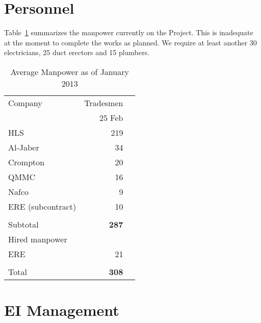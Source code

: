 \section*{Personnel}


 Table~\ref{personnel} summarizes the manpower currently on the Project. This is inadequate at the moment to complete the works as planned. We require at least another 30 electricians, 25 duct erectors and 15 plumbers.

\def\Z{\phantom{Z}}
\begin{table}[htbp]
\begin{center}
\begin{tabular}{l r r}
\toprule
Company           &Tradesmen  \\
~                 &25 Feb \\
\midrule
HLS                &219         \\
Al-Jaber          &34         \\
Crompton        &20           \\
QMMC            &16        \\
Nafco             &9           \\
ERE (subcontract)               &10          \\
                 
                  &\underline{\phantom{1075}}\\
Subtotal          &\textbf{287}        \\

Hired manpower    &         \\
\Z ERE            &21        \\
          
                 
&&\\
Total                      &\textbf{308}       \\
                           
\bottomrule
\end{tabular}
\caption{Average Manpower as of January 2013}
\label{personnel}
\end{center}
\end{table}





\section*{EI Management}


